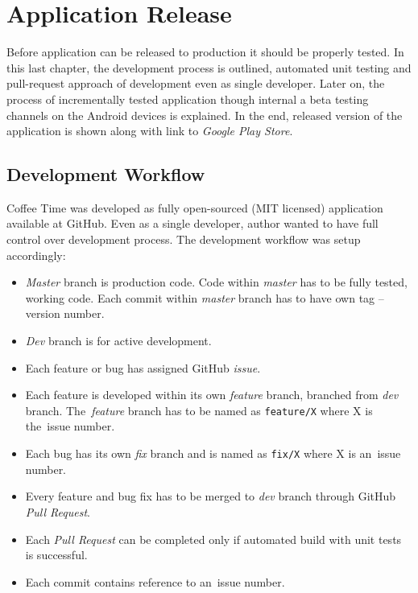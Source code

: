 \chapter{Application Release}
\label{ch:testing}

Before application can be released to production it should be properly tested. In this last chapter, the development process is outlined, automated unit testing and pull-request approach of development even as single developer. Later on, the process of incrementally tested application though internal a beta testing channels on the Android devices is explained. In the end, released version of the application is shown along with link to \textit{Google Play Store}. 

\section{Development Workflow}
Coffee Time was developed as fully open-sourced (MIT licensed) application available at GitHub. Even as a single developer, author wanted to have full control over development process. The development workflow was setup accordingly:

\begin{itemize}
    \item \textit{Master} branch is production code. Code within \textit{master} has to be fully tested, working code. Each commit within \textit{master} branch has to have own tag -- version number.
    \item \textit{Dev} branch is for active development. 
    \item Each feature or bug has assigned GitHub \textit{issue}.  
    \item Each feature is developed within its own \textit{feature} branch, branched from \textit{dev} branch. The~\textit{feature} branch has to be named as \verb|feature/X| where X is the~issue number.
    \item Each bug has its own \textit{fix} branch and is named as \verb|fix/X| where X is an~issue number.
    \item Every feature and bug fix has to be merged to \textit{dev} branch through GitHub \textit{Pull Request}.
    \item Each \textit{Pull Request} can be completed only if automated build with unit tests is successful.
    \item Each commit contains reference to an~issue number. 
\end{itemize}

